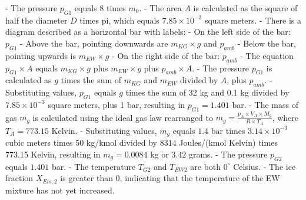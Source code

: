 - The pressure \( p_{G1} \) equals 8 times \( m_0 \).
- The area \( A \) is calculated as the square of half the diameter \( D \) times pi, which equals \( 7.85 \times 10^{-3} \) square meters.
- There is a diagram described as a horizontal bar with labels:
  - On the left side of the bar: \( p_{G1} \)
  - Above the bar, pointing downwards are \( m_{KG} \times g \) and \( p_{amb} \)
  - Below the bar, pointing upwards is \( m_{EW} \times g \)
  - On the right side of the bar: \( p_{amb} \)
- The equation \( p_{G1} \times A \) equals \( m_{KG} \times g \) plus \( m_{EW} \times g \) plus \( p_{amb} \times A \).
- The pressure \( p_{G1} \) is calculated as \( g \) times the sum of \( m_{KG} \) and \( m_{EW} \) divided by \( A \), plus \( p_{amb} \).
- Substituting values, \( p_{G1} \) equals \( g \) times the sum of 32 kg and 0.1 kg divided by \( 7.85 \times 10^{-3} \) square meters, plus 1 bar, resulting in \( p_{G1} = 1.401 \) bar.
- The mass of gas \( m_g \) is calculated using the ideal gas law rearranged to \( m_g = \frac{p_A \times V_A \times M_g}{R \times T_A} \), where \( T_A = 773.15 \) Kelvin.
- Substituting values, \( m_g \) equals \( 1.4 \) bar times \( 3.14 \times 10^{-3} \) cubic meters times 50 kg/kmol divided by \( 8314 \) Joules/(kmol Kelvin) times 773.15 Kelvin, resulting in \( m_g = 0.0084 \) kg or \( 3.42 \) grams.
- The pressure \( p_{G2} \) equals \( 1.401 \) bar.
- The temperature \( T_{G2} \) and \( T_{EW2} \) are both \( 0^\circ \) Celsius.
- The ice fraction \( X_{Eis,2} \) is greater than 0, indicating that the temperature of the EW mixture has not yet increased.